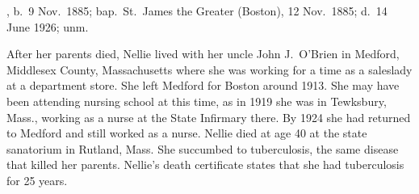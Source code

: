 \begin{Kids}
	, b.\ 9 Nov.\ 1885;\cite{Ellen4OBrienBirth} bap.\ St.\ James the Greater (Boston), 12 Nov.\ 1885;\cite{Ellen4OBrienBaptism} d.\ 14 June 1926;\cite{Ellen4OBrienDeath} unm.
	
	\begin{KidsMoreText}
		After her parents died, Nellie lived with her uncle John J.\ O'Brien in Medford, Middlesex County, Massachusetts\cite{Census1900EllenOBrien} where she was working for a time as a saleslady at a department store.\cite{Census1910EllenOBrien} She left Medford for Boston around 1913.\cite{Ellen4OBrien1914} She may have been attending nursing school at this time, as in 1919 she was in Tewksbury, Mass., working as a nurse at the State Infirmary there.\cite{Ellen4OBrien1919,Census1920EllenOBrien} By 1924 she had returned to Medford and still worked as a nurse.\cite{Ellen4OBrien1924} Nellie died at age 40 at the state sanatorium in Rutland, Mass.\cite{Ellen4OBrienDeath,RutlandHospital} She succumbed to tuberculosis,\cite{Ellen4OBrienDeath2} the same disease that killed her parents. Nellie's death certificate states that she had tuberculosis for 25 years.\cite{Ellen4OBrienDeath2}
	\end{KidsMoreText}

\end{Kids}